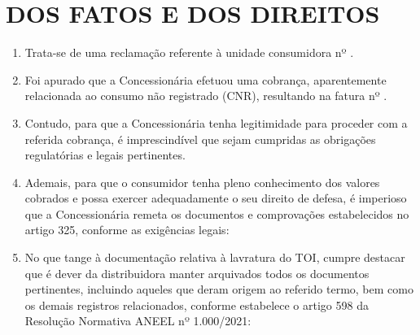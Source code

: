 \newcommand{\tipoRequerimento}{Defesa de TOI}

\section{DOS FATOS E DOS DIREITOS}

\begin{enumerate}[resume]
\item Trata-se de uma reclamação referente à unidade consumidora nº \unidadeConsumidora{}.
\item Foi apurado que a Concessionária efetuou uma cobrança, aparentemente relacionada ao consumo não registrado (CNR), resultando na fatura nº \fatura{}.
\item Contudo, para que a Concessionária tenha legitimidade para proceder com a referida cobrança, é imprescindível que sejam cumpridas as obrigações regulatórias e legais pertinentes.
\item Ademais, para que o consumidor tenha pleno conhecimento dos valores cobrados e possa exercer adequadamente o seu direito de defesa, é imperioso que a Concessionária remeta os documentos e comprovações estabelecidos no artigo 325, conforme as exigências legais:


\item No que tange à documentação relativa à lavratura do TOI, cumpre destacar que é dever da distribuidora manter arquivados todos os documentos pertinentes, incluindo aqueles que deram origem ao referido termo, bem como os demais registros relacionados, conforme estabelece o artigo 598 da Resolução Normativa ANEEL nº 1.000/2021:

\end{enumerate}
